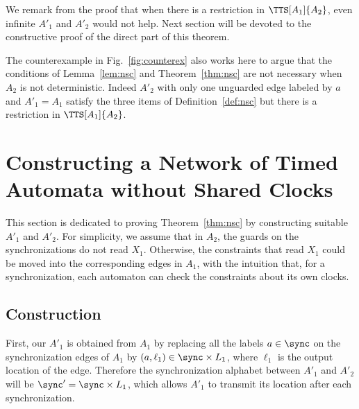\documentclass{LMCS}
\theoremstyle{plain}\newtheorem*{prop11}{Proposition~\ref{prop:states} bis}
\begin{document}
We remark from the proof that when there is a restriction in $\TTS[A_1]{A_2}$,
even infinite $A'_1$ and $A'_2$ would not help. Next section will be devoted to the constructive proof of the direct part of
this theorem.

The counterexample in Fig.~\ref{fig:counterex} also works here to argue that the
conditions of Lemma~\ref{lem:nsc} and Theorem~\ref{thm:nsc} are not necessary
when $A_2$ is not deterministic. Indeed $A'_2$ with only one unguarded edge
labeled by $a$ and $A'_1=A_1$ satisfy the three items of
Definition~\ref{def:nsc} but there is a restriction in $\TTS[A_1]{A_2}$.





\section{Constructing a Network of Timed Automata without Shared Clocks}\label{sec:construction}
This section is dedicated to proving Theorem~\ref{thm:nsc} by constructing
suitable $A'_1$ and $A'_2$.
For simplicity, we assume that in $A_2$, the guards on the synchronizations do
not read $X_1$. Otherwise, the constraints that read $X_1$ could be moved
into the corresponding edges in $A_1$, with the intuition that, for a
synchronization, each automaton can check the constraints about its own clocks.


\subsection{Construction}\label{subsec:simple}
First, our $A'_1$ is obtained from $A_1$ by replacing all the labels
$a\in\sync$ on the synchronization edges of $A_1$ by
$(a,\ell_1)\in\sync\times L_1$, where $\ell_1$ is the output location of the
edge. Therefore the synchronization alphabet between $A'_1$ and $A'_2$ will
be $\sync'=\sync\times L_1$, which allows $A'_1$ to transmit its location
after each synchronization.
\end{document}
